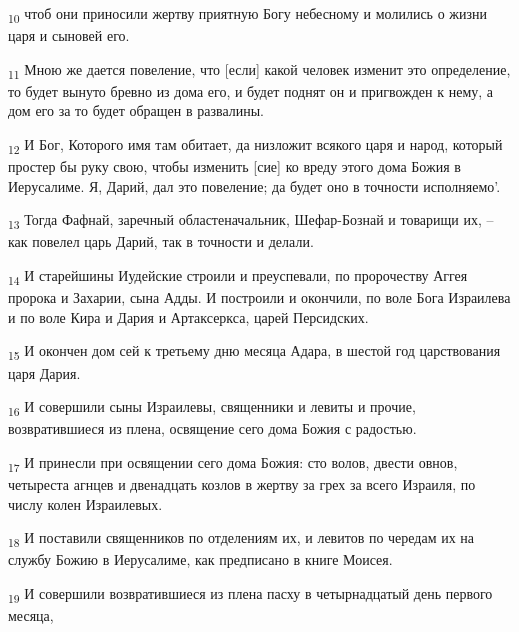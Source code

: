 \begin{tcolorbox}
\textsubscript{10} чтоб они приносили жертву приятную Богу небесному и молились о жизни царя и сыновей его.
\end{tcolorbox}
\begin{tcolorbox}
\textsubscript{11} Мною же дается повеление, что [если] какой человек изменит это определение, то будет вынуто бревно из дома его, и будет поднят он и пригвожден к нему, а дом его за то будет обращен в развалины.
\end{tcolorbox}
\begin{tcolorbox}
\textsubscript{12} И Бог, Которого имя там обитает, да низложит всякого царя и народ, который простер бы руку свою, чтобы изменить [сие] ко вреду этого дома Божия в Иерусалиме. Я, Дарий, дал это повеление; да будет оно в точности исполняемо'.
\end{tcolorbox}
\begin{tcolorbox}
\textsubscript{13} Тогда Фафнай, заречный областеначальник, Шефар-Бознай и товарищи их, --как повелел царь Дарий, так в точности и делали.
\end{tcolorbox}
\begin{tcolorbox}
\textsubscript{14} И старейшины Иудейские строили и преуспевали, по пророчеству Аггея пророка и Захарии, сына Адды. И построили и окончили, по воле Бога Израилева и по воле Кира и Дария и Артаксеркса, царей Персидских.
\end{tcolorbox}
\begin{tcolorbox}
\textsubscript{15} И окончен дом сей к третьему дню месяца Адара, в шестой год царствования царя Дария.
\end{tcolorbox}
\begin{tcolorbox}
\textsubscript{16} И совершили сыны Израилевы, священники и левиты и прочие, возвратившиеся из плена, освящение сего дома Божия с радостью.
\end{tcolorbox}
\begin{tcolorbox}
\textsubscript{17} И принесли при освящении сего дома Божия: сто волов, двести овнов, четыреста агнцев и двенадцать козлов в жертву за грех за всего Израиля, по числу колен Израилевых.
\end{tcolorbox}
\begin{tcolorbox}
\textsubscript{18} И поставили священников по отделениям их, и левитов по чередам их на службу Божию в Иерусалиме, как предписано в книге Моисея.
\end{tcolorbox}
\begin{tcolorbox}
\textsubscript{19} И совершили возвратившиеся из плена пасху в четырнадцатый день первого месяца,
\end{tcolorbox}

